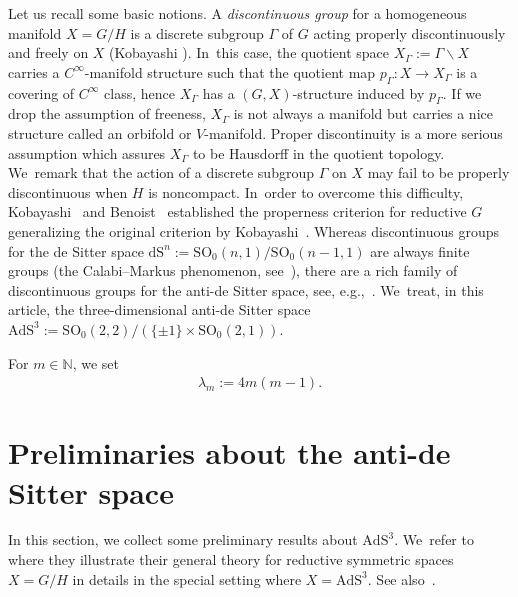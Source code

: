 \documentclass[11pt]{article}
\numberwithin{equation}{section}
\numberwithin{equation}{section}
\begin{document}
Let us recall some basic notions.
A \textit{discontinuous group} for a homogeneous manifold \mbox{$X\!=\!G/H$}
is a discrete subgroup $\Gamma$ of $G$ acting properly discontinuously
and freely on $X$ (Kobayashi \cite[Definition~1.3]{Ko01}). In~this case, the quotient space $X_{\Gamma}:=\Gamma\backslash X$ carries a
$C^{\infty}$-manifold structure such that
the quotient map $p_{\Gamma}\colon X\rightarrow X_{\Gamma}$ is a covering of
$C^{\infty}$ class, hence $X_{\Gamma}$ has a $(G,X)$-structure induced by $p_{\Gamma}$.
If we drop the assumption of freeness, $X_{\Gamma}$ is not always a manifold but
carries a nice structure called an orbifold or $V$-manifold.
Proper discontinuity is a more
serious assumption which assures $X_{\Gamma}$ to be Hausdorff in the quotient topology. We~remark that the action of a discrete subgroup $\Gamma$ on $X$
may fail to be properly discontinuous
when $H$ is noncompact. In~order to overcome this difficulty,
Kobayashi~\cite{Kob96} and Benoist~\cite{Ben96} established the properness criterion
for reductive $G$ generalizing the original criterion by Kobayashi~\cite{Kob89}.
Whereas discontinuous groups for the de Sitter space
$\mathrm{dS}^{n}:=\mathrm{SO}_{0}(n,1)/\mathrm{SO}_{0}(n-1,1)$
are always finite groups
(the Calabi--Markus phenomenon, see~\cite{CaMa62, Kob89}),
there are a rich family of discontinuous groups for
the anti-de Sitter space, see, e.g.,~\cite{Go85, Kob98, Sa00}. We~treat, in this article, the three-dimensional anti-de Sitter space
$\mathrm{AdS}^{3}:=\mathrm{SO}_{0}(2,2)/(\{\pm1\}\times\mathrm{SO}_{0}(2,1))$.

For $m\in \mathbb{N}$, we set
\begin{gather*}%
\lambda_{m} := 4m(m-1).
\end{gather*}


\section{Preliminaries about the anti-de Sitter space}
\label{Preliminary-AdS}

In this section, we collect some preliminary results about $\mathrm{AdS}^{3}$. We~refer to \cite[Section~9]{KaKob16} where they illustrate their general theory
for reductive symmetric spaces $X=G/H$ in details in the special setting where
$X=\mathrm{AdS}^{3}$. See also~\cite{Kan19}.
\end{document}
